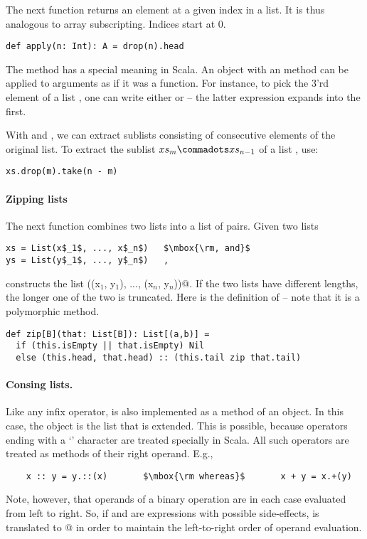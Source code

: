 The next function returns an element at a given index in a list.
It is thus analogous to array subscripting. Indices start at 0.
\begin{lstlisting}
def apply(n: Int): A = drop(n).head
\end{lstlisting}
The  method has a special meaning in Scala. An object with
an  method can be applied to arguments as if it was a
function. For instance, to pick the 3'rd element of a list ,
one can write either  or  -- the latter
expression expands into the first.

With  and , we can extract sublists consisting
of consecutive elements of the original list.  To extract the sublist
$xs_m \commadots xs_{n-1}$ of a list , use:

\begin{lstlisting}
xs.drop(m).take(n - m)
\end{lstlisting}

\paragraph{Zipping lists} The next function combines two lists into a list of pairs.
Given two lists
\begin{lstlisting}
xs = List(x$_1$, ..., x$_n$)   $\mbox{\rm, and}$
ys = List(y$_1$, ..., y$_n$)   ,
\end{lstlisting}
 constructs the list
\lstinline@List((x$_1$, y$_1$), ..., (x$_n$, y$_n$))@.
If the two lists have different lengths, the longer one of the two is
truncated. Here is the definition of  -- note that it is a
polymorphic method.
\begin{lstlisting}
def zip[B](that: List[B]): List[(a,b)] =
  if (this.isEmpty || that.isEmpty) Nil
  else (this.head, that.head) :: (this.tail zip that.tail)
\end{lstlisting}

\paragraph{Consing lists.}
Like any infix operator, \code{::}
is also implemented as a method of an object. In this case, the object
is the list that is extended. This is possible, because operators
ending with a `\code{:}' character are treated specially in Scala.  
All such operators are treated as methods of their right operand. E.g.,
\begin{lstlisting}
    x :: y = y.::(x)       $\mbox{\rm whereas}$       x + y = x.+(y)                  
\end{lstlisting}
Note, however, that operands of a binary operation are in each case
evaluated from left to right.  So, if  and  are
expressions with possible side-effects,  is translated to
@ in order to maintain the left-to-right
order of operand evaluation.

